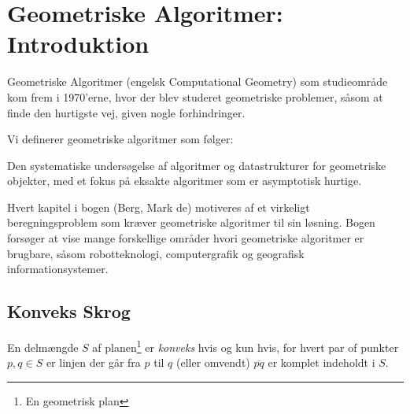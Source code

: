 \chapter{Geometriske Algoritmer: Introduktion}

Geometriske Algoritmer (engelsk Computational Geometry) som studieområde kom frem i 1970'erne, hvor der blev studeret geometriske problemer, såsom at finde den hurtigste vej, given nogle forhindringer.

Vi definerer geometriske algoritmer som følger:

\begin{definition}
	Den systematiske undersøgelse af algoritmer og datastrukturer for geometriske objekter, med et fokus på eksakte algoritmer som er asymptotisk hurtige.
\end{definition}

Hvert kapitel i bogen (Berg, Mark de) motiveres af et virkeligt beregningsproblem  som kræver geometriske algoritmer til sin løsning. Bogen forsøger at vise mange forskellige områder hvori geometriske algoritmer er brugbare, såsom robotteknologi,  computergrafik og geografisk informationsystemer.

\section{Konveks Skrog}%
\label{sec:label}

\begin{definition}[Konveks]
	En delmængde $S$ af planen\footnote{En geometrisk plan} er \textit{konveks} hvis og kun hvis, for hvert par of punkter $p, q \in S$ er linjen der går fra $p$ til $q$ (eller omvendt) $\overline{pq}$ er komplet indeholdt i $S$.
\end{definition}

